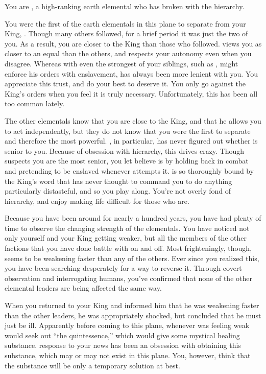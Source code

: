 \documentclass[char]{elementals}
\begin{document}
\name{\cRogue{}}

You are \cRogue{\intro}, a high-ranking earth elemental who has broken with the hierarchy.

You were the first of the earth elementals in this plane to separate from your King, \cEarthKing{}.  Though many others followed, for a brief period it was just the two of you.  As a result, you are closer to the King than those who followed.  \cEarthKing{\They} views you as closer to an equal than the others, and respects your autonomy even when you disagree.  Whereas with even the strongest of your siblings, such as \cLoyal{\intro}, \cEarthKing{} might enforce his orders with enslavement, \cEarthKing{\they} has always been more lenient with you.  You appreciate this trust, and do your best to deserve it.  You only go against the King's orders when you feel it is truly necessary.  Unfortunately, this has been all too common lately.

The other elementals know that you are close to the King, and that he allows you to act independently, but they do not know that you were the first to separate and therefore the most powerful.  \cLoyal{}, in particular, has never figured out whether \cLoyal{\they} is senior to you.  Because of \cLoyal{\their} obsession with hierarchy, this drives \cLoyal{\them} crazy.  Though \cLoyal{\they} suspects you are the most senior, you let \cLoyal{\them} believe \cLoyal{\they} is by holding back in combat and pretending to be enslaved whenever \cLoyal{\they} attempts it.  \cLoyal{} is so thoroughly bound by the King's word that \cLoyal{\they} has never thought to command you to do anything particularly distasteful, and so you play along.  You're not overly fond of hierarchy, and enjoy making life difficult for those who are.

Because you have been around for nearly a hundred years, you have had plenty of time to observe the changing strength of the elementals.  You have noticed not only yourself and your King getting weaker, but all the members of the other factions that you have done battle with on and off.  Most frighteningly, though, \cEarthKing{} seems to be weakening faster than any of the others.  Ever since you realized this, you have been searching desperately for a way to reverse it.  Through covert observation and interrogating humans, you've confirmed that none of the other elemental leaders are being affected the same way.

When you returned to your King and informed him that he was weakening faster than the other leaders, he was appropriately shocked, but concluded that he must just be ill.  Apparently before coming to this plane, whenever \cEarthKing{\they} was feeling weak \cEarthKing{\they} would seek out ``the quintessence,'' which would give \cEarthKing{\them} some mystical healing substance.  \cEarthKing{\Their} response to your news has been an obsession with obtaining this substance, which may or may not exist in this plane.  You, however, think that the substance will be only a temporary solution at best.
\end{document}

